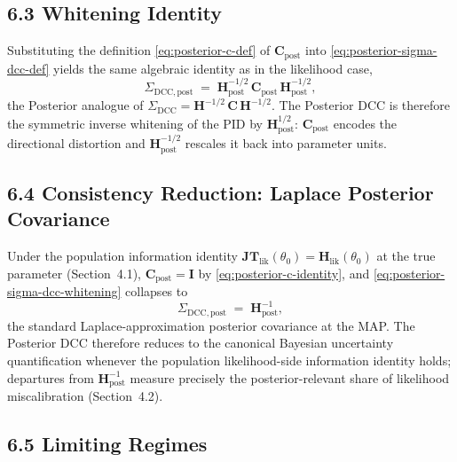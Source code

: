 \documentclass[11pt]{article}
\begin{document}
\subsection*{6.3 Whitening Identity}

Substituting the definition \eqref{eq:posterior-c-def} of $\mathbf C_{\mathrm{post}}$ into \eqref{eq:posterior-sigma-dcc-def} yields the same algebraic identity as in the likelihood case,
\begin{equation}
\Sigma_{\mathrm{DCC},\mathrm{post}}
\;=\;
\mathbf H_{\mathrm{post}}^{-1/2}\,
\mathbf C_{\mathrm{post}}\,
\mathbf H_{\mathrm{post}}^{-1/2},
\label{eq:posterior-sigma-dcc-whitening}
\end{equation}
the Posterior analogue of $\Sigma_{\mathrm{DCC}} = \mathbf H^{-1/2}\, \mathbf C\, \mathbf H^{-1/2}$. The Posterior DCC is therefore the symmetric inverse whitening of the PID by $\mathbf H_{\mathrm{post}}^{1/2}$: $\mathbf C_{\mathrm{post}}$ encodes the directional distortion and $\mathbf H_{\mathrm{post}}^{-1/2}$ rescales it back into parameter units.

\subsection*{6.4 Consistency Reduction: Laplace Posterior Covariance}

Under the population information identity $\mathbf{JT}_{\mathrm{lik}}(\theta_0) = \mathbf H_{\mathrm{lik}}(\theta_0)$ at the true parameter (Section~4.1), $\mathbf C_{\mathrm{post}} = \mathbf I$ by \eqref{eq:posterior-c-identity}, and \eqref{eq:posterior-sigma-dcc-whitening} collapses to
\begin{equation}
\Sigma_{\mathrm{DCC},\mathrm{post}}
\;=\;
\mathbf H_{\mathrm{post}}^{-1},
\label{eq:posterior-sigma-dcc-laplace}
\end{equation}
the standard Laplace-approximation posterior covariance at the MAP. The Posterior DCC therefore reduces to the canonical Bayesian uncertainty quantification whenever the population likelihood-side information identity holds; departures from $\mathbf H_{\mathrm{post}}^{-1}$ measure precisely the posterior-relevant share of likelihood miscalibration (Section~4.2).

\subsection*{6.5 Limiting Regimes}
\end{document}
